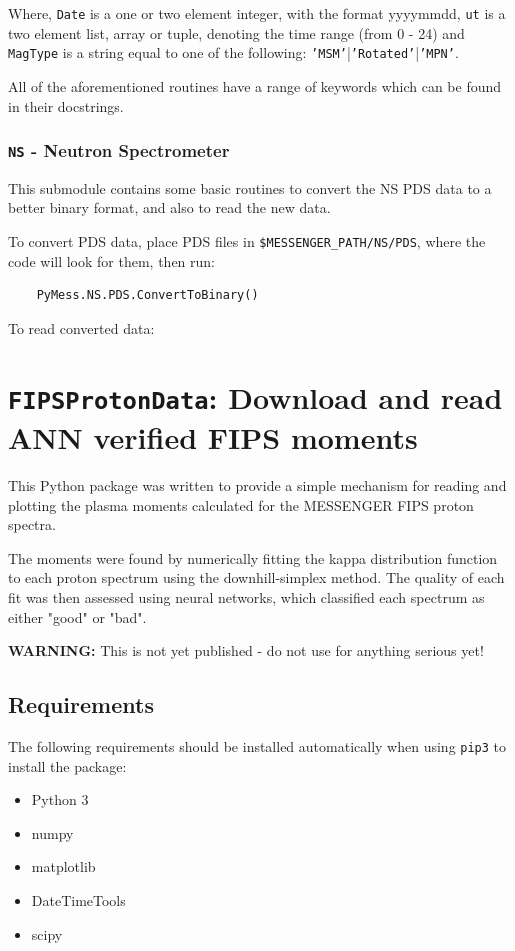 	Where, \texttt{Date} is a one or two element integer, with the format yyyymmdd,
	\texttt{ut} is a two element list, array or tuple, denoting the time range 
	(from 0 - 24)  and \texttt{MagType} is a string equal to one of the following:
	\texttt{'MSM'}|\texttt{'Rotated'}|\texttt{'MPN'}.
	
	All of the aforementioned routines have a range of keywords which can be
	found in their docstrings.
	
	\subsubsection{\texttt{NS} - Neutron Spectrometer}
	
	This submodule contains some basic routines to convert the NS PDS data 
	to a better binary format, and also to read the new data.
	
	To convert PDS data, place PDS files in \texttt{\$MESSENGER\_PATH/NS/PDS}, where the code will look
	for them, then run:
	
	\begin{verbatim}
	PyMess.NS.PDS.ConvertToBinary()
	\end{verbatim}
	
	To read converted data:
	

	\section{\texttt{FIPSProtonData}: Download and read ANN verified FIPS moments}


	This Python package was written to provide a simple mechanism for 
	reading and plotting the plasma moments calculated for the MESSENGER 
	FIPS proton spectra.
	
	The moments were found by numerically fitting the kappa distribution 
	function to each proton spectrum using the downhill-simplex method. The
	quality of each fit was then assessed using neural networks, which 
	classified each spectrum as either "good" or "bad".
	
	\textbf{WARNING:} This is not yet published - do not use for anything serious yet!
	
	\subsection{Requirements}
	The following requirements should be installed automatically when using 
	\texttt{pip3} to install the package:
	
	\begin{itemize}
		\item Python 3
		\item numpy
		\item matplotlib
		\item DateTimeTools
		\item scipy
	\end{itemize}
	
